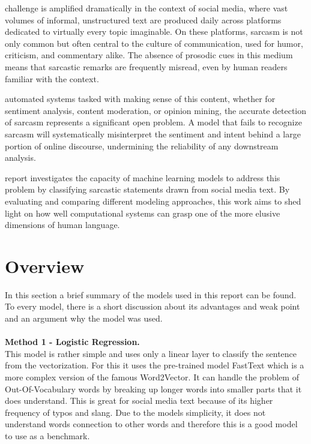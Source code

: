 \documentclass[
 reprint,
 amsmath,amssymb,
 aps,
]{revtex4-2}
\begin{document}
 challenge is amplified dramatically in the context of social media, where vast volumes of informal, unstructured text are produced daily across platforms dedicated to virtually every topic imaginable. On these platforms, sarcasm is not only common but often central to the culture of communication, used for humor, criticism, and commentary alike. The absence of prosodic cues in this medium means that sarcastic remarks are frequently misread, even by human readers familiar with the context.

 automated systems tasked with making sense of this content, whether for sentiment analysis, content moderation, or opinion mining, the accurate detection of sarcasm represents a significant open problem. A model that fails to recognize sarcasm will systematically misinterpret the sentiment and intent behind a large portion of online discourse, undermining the reliability of any downstream analysis.

 report investigates the capacity of machine learning models to address this problem by classifying sarcastic statements drawn from social media text. By evaluating and comparing different modeling approaches, this work aims to shed light on how well computational systems can grasp one of the more elusive dimensions of human language.

\section{\label{sec:overview}Overview} %
\noindent
In this section a brief summary of the models used in this report can be found. To every model, there is a short discussion about its advantages and weak point and an argument why the model was used.
\\ \\
\noindent
{\bf Method 1 - Logistic Regression.} \\{This model is rather simple and uses only a linear layer to classify the sentence from the vectorization. For this it uses the pre-trained model FastText \cite{grave2018learning} which is a more complex version of the famous Word2Vector. It can handle the problem of Out-Of-Vocabulary words by breaking up longer words into smaller parts that it does understand. This is great for social media text because of its higher frequency of typos and slang. Due to the models simplicity, it does not understand words connection to other words and therefore this is a good model to use as a benchmark.}
\\
\end{document}

